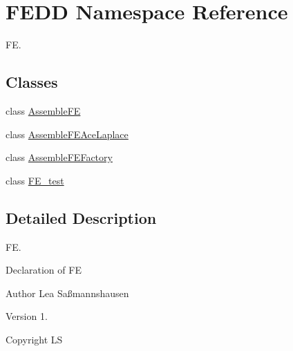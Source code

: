 \hypertarget{namespaceFEDD}{}\section{F\+E\+DD Namespace Reference}
\label{namespaceFEDD}


FE.  


\subsection*{Classes}
\begin{DoxyCompactItemize}
\item 
class \hyperlink{classFEDD_1_1AssembleFE}{Assemble\+FE}
\item 
class \hyperlink{classFEDD_1_1AssembleFEAceLaplace}{Assemble\+F\+E\+Ace\+Laplace}
\item 
class \hyperlink{classFEDD_1_1AssembleFEFactory}{Assemble\+F\+E\+Factory}
\item 
class \hyperlink{classFEDD_1_1FE__test}{F\+E\+\_\+test}
\end{DoxyCompactItemize}


\subsection{Detailed Description}
FE. 

Declaration of FE

\begin{DoxyAuthor}{Author}
Lea Saßmannshausen 
\end{DoxyAuthor}
\begin{DoxyVersion}{Version}
1. 
\end{DoxyVersion}
\begin{DoxyCopyright}{Copyright}
LS 
\end{DoxyCopyright}
